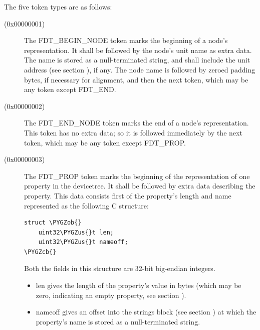 \documentclass[a4paper,10pt,oneside]{sphinxmanual}
\def\PYGZus{\char`\_}
\def\PYGZob{\char`\{}
\def\PYGZcb{\char`\}}
\begin{document}
The five token types are as follows:
\begin{description}
\item[{ (0x00000001)}] \leavevmode
The FDT\_BEGIN\_NODE token marks the beginning of a node’s
representation. It shall be followed by the node’s unit name as
extra data. The name is stored as a null-terminated string, and
shall include the unit address (see section {\hyperref[devicetree\string-basics:sect\string-node\string-names]{}}), if any.
The node name is followed by zeroed padding bytes, if necessary for
alignment, and then the next token, which may be any token except
FDT\_END.

\item[{ (0x00000002)}] \leavevmode
The FDT\_END\_NODE token marks the end of a node’s representation.
This token has no extra data; so it is followed immediately by the
next token, which may be any token except FDT\_PROP.

\item[{ (0x00000003)}] \leavevmode
The FDT\_PROP token marks the beginning of the representation of one
property in the devicetree. It shall be followed by extra data
describing the property. This data consists first of the property’s
length and name represented as the following C structure:

\begin{Verbatim}[commandchars=\\\{\}]
struct \PYGZob{}
    uint32\PYGZus{}t len;
    uint32\PYGZus{}t nameoff;
\PYGZcb{}
\end{Verbatim}

Both the fields in this structure are 32-bit big-endian integers.
\begin{itemize}
\item {} 
len gives the length of the property’s value in bytes (which may be
zero, indicating an empty property, see section {\hyperref[devicetree\string-basics:sect\string-property\string-values]{}}).

\item {} 
nameoff gives an offset into the strings block
(see section {\hyperref[flattened\string-format:sect\string-fdt\string-strings\string-block]{}})
at which the property’s name is stored as a null-terminated string.

\end{itemize}


\end{description}
\end{document}
